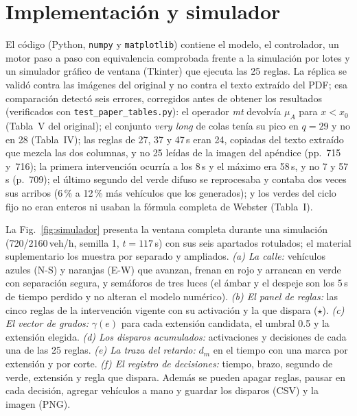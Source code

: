 \documentclass[journal]{IEEEtran}
\begin{document}
\section{Implementación y simulador}
\label{sec:implementacion}

El código (Python, \texttt{numpy} y \texttt{matplotlib}) contiene el modelo, el controlador, un motor paso a paso con equivalencia comprobada frente a la simulación por lotes y un simulador gráfico de ventana (Tkinter) que ejecuta las 25 reglas. La réplica se validó contra las imágenes del original y no contra el texto extraído del PDF; esa comparación detectó seis errores, corregidos antes de obtener los resultados (verificados con \texttt{test\_paper\_tables.py}): el operador \emph{mt} devolvía $\mu_A$ para $x<x_0$ (Tabla~V del original); el conjunto \emph{very long} de colas tenía su pico en $q=29$ y no en 28 (Tabla~IV); las reglas de 27, 37 y 47\,s eran 24, copiadas del texto extraído que mezcla las dos columnas, y no 25 leídas de la imagen del apéndice (pp.~715 y~716); la primera intervención ocurría a los 8\,s y el máximo era 58\,s, y no 7 y 57\,s (p.~709); el último segundo del verde difuso se reprocesaba y contaba dos veces sus arribos (6\,\% a 12\,\% más vehículos que los generados); y los verdes del ciclo fijo no eran enteros ni usaban la fórmula completa de Webster (Tabla~I).


La Fig.~\ref{fig:simulador} presenta la ventana completa durante una simulación (720/2160\,veh/h, semilla 1, $t=117$\,s) con sus seis apartados rotulados; el material suplementario los muestra por separado y ampliados. \textit{(a) La calle:} vehículos azules (N-S) y naranjas (E-W) que avanzan, frenan en rojo y arrancan en verde con separación segura, y semáforos de tres luces (el ámbar y el despeje son los 5\,s de tiempo perdido y no alteran el modelo numérico). \textit{(b) El panel de reglas:} las cinco reglas de la intervención vigente con su activación y la que dispara ($\star$). \textit{(c) El vector de grados:} $\gamma(e)$ para cada extensión candidata, el umbral 0.5 y la extensión elegida. \textit{(d) Los disparos acumulados:} activaciones y decisiones de cada una de las 25 reglas. \textit{(e) La traza del retardo:} $d_m$ en el tiempo con una marca por extensión y por corte. \textit{(f) El registro de decisiones:} tiempo, brazo, segundo de verde, extensión y regla que dispara. Además se pueden apagar reglas, pausar en cada decisión, agregar vehículos a mano y guardar los disparos (CSV) y la imagen (PNG).
\end{document}

